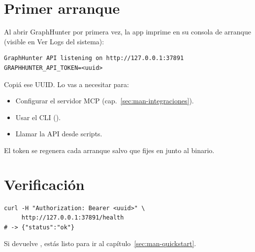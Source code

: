 \section{Primer arranque}

Al abrir GraphHunter por primera vez, la app imprime en su consola
de arranque (visible en Ver \textrightarrow{} Logs del sistema):

\begin{lstlisting}[basicstyle=\ttfamily\small]
GraphHunter API listening on http://127.0.0.1:37891
GRAPHHUNTER_API_TOKEN=<uuid>
\end{lstlisting}

Copiá ese UUID. Lo vas a necesitar para:

\begin{itemize}
    \item Configurar el servidor MCP (cap.~\ref{sec:man-integraciones}).
    \item Usar el CLI ().
    \item Llamar la API desde scripts.
\end{itemize}

El token se regenera cada arranque salvo que fijes
 en  junto al binario.

\section{Verificación}

\begin{lstlisting}[basicstyle=\ttfamily\small]
curl -H "Authorization: Bearer <uuid>" \
     http://127.0.0.1:37891/health
# -> {"status":"ok"}
\end{lstlisting}

Si devuelve , estás listo para ir al
capítulo~\ref{sec:man-quickstart}.
